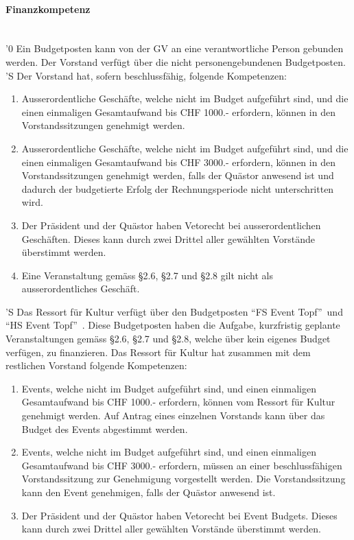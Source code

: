 \documentclass[a4paper,11pt]{article}
\begin{document}
\paragraph{Finanzkompetenz} \ \\
'0 Ein Budgetposten kann von der GV an eine verantwortliche Person gebunden werden. Der Vorstand verfügt über die nicht personengebundenen Budgetposten.
'S Der Vorstand hat, sofern beschlussfähig, folgende Kompetenzen:
\begin{enumerate}
  \item Ausserordentliche Geschäfte, welche nicht im Budget aufgeführt sind, und die einen einmaligen Gesamtaufwand bis CHF 1000.- erfordern, können in den Vorstandssitzungen genehmigt werden.
  \item Ausserordentliche Geschäfte, welche nicht im Budget aufgeführt sind, und die einen einmaligen Gesamtaufwand bis CHF 3000.- erfordern, können in den Vorstandssitzungen genehmigt werden, falls der Quästor anwesend ist und dadurch der budgetierte Erfolg der Rechnungsperiode nicht unterschritten wird.
  \item Der Präsident und der Quästor haben Vetorecht bei ausserordentlichen Geschäften. Dieses kann durch zwei Drittel aller gewählten Vorstände überstimmt werden.
  \item Eine Veranstaltung gemäss \S 2.6, \S 2.7 und \S 2.8 gilt nicht als ausserordentliches Geschäft.
\end{enumerate}
'S Das Ressort für Kultur verfügt über den Budgetposten ``FS Event Topf''\ und ``HS Event Topf''\ . Diese Budgetposten haben die Aufgabe, kurzfristig geplante Veranstaltungen gemäss \S 2.6, \S 2.7 und \S 2.8, welche über kein eigenes Budget verfügen, zu finanzieren. Das Ressort für Kultur hat zusammen mit dem restlichen Vorstand folgende Kompetenzen:
\begin{enumerate}
	\item Events, welche nicht im Budget aufgeführt sind, und einen einmaligen Gesamtaufwand bis CHF 1000.- erfordern, können vom Ressort für Kultur genehmigt werden. Auf Antrag eines einzelnen Vorstands kann über das Budget des Events abgestimmt werden.
	\item Events, welche nicht im Budget aufgeführt sind, und einen einmaligen Gesamtaufwand bis CHF 3000.- erfordern, müssen an einer beschlussfähigen Vorstandssitzung zur Genehmigung vorgestellt werden. Die Vorstandssitzung kann den Event genehmigen, falls der Quästor anwesend ist.
	\item Der Präsident und der Quästor haben Vetorecht bei Event Budgets. Dieses kann durch zwei Drittel aller gewählten Vorstände überstimmt werden.
\end{enumerate}
\end{document}
